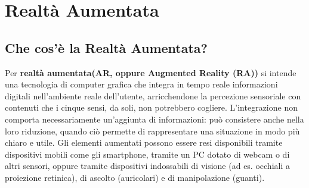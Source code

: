 \chapter{Realtà Aumentata}

\section{Che cos’è la Realtà Aumentata?}

Per \textbf{realtà aumentata(AR, oppure Augmented Reality (RA))} \cite{augmented-reality-1}\cite{augmented-reality-2} si intende una tecnologia di computer grafica che integra in tempo reale informazioni digitali nell’ambiente reale dell’utente, arricchendone la percezione sensoriale con contenuti che i cinque sensi, da soli, non potrebbero cogliere. L’integrazione non comporta necessariamente un’aggiunta di informazioni: può consistere anche nella loro riduzione, quando ciò permette di rappresentare una situazione in modo più chiaro e utile. Gli elementi aumentati possono essere resi disponibili tramite dispositivi mobili come gli smartphone, tramite un PC dotato di webcam o di altri sensori, oppure tramite dispositivi indossabili di visione (ad es. occhiali a proiezione retinica), di ascolto (auricolari) e di manipolazione (guanti). \newline

